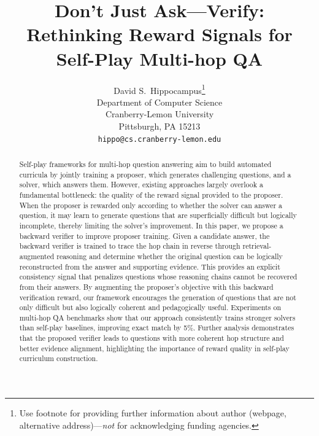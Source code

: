 \documentclass{article}
\title{Don’t Just Ask—Verify: Rethinking Reward Signals for Self-Play Multi-hop QA}
\author{%
  David S.~Hippocampus\thanks{Use footnote for providing further information
    about author (webpage, alternative address)---\emph{not} for acknowledging
    funding agencies.} \\
  Department of Computer Science\\
  Cranberry-Lemon University\\
  Pittsburgh, PA 15213 \\
  \texttt{hippo@cs.cranberry-lemon.edu} \\
}
\begin{document}
\maketitle


\begin{abstract}
  Self-play frameworks for multi-hop question answering aim to build automated curricula by jointly training a proposer, which generates challenging questions, and a solver, which answers them. However, existing approaches largely overlook a fundamental bottleneck: the quality of the reward signal provided to the proposer. When the proposer is rewarded only according to whether the solver can answer a question, it may learn to generate questions that are superficially difficult but logically incomplete, thereby limiting the solver’s improvement.
In this paper, we propose a backward verifier to improve proposer training. Given a candidate answer, the backward verifier is trained to trace the hop chain in reverse through retrieval-augmented reasoning and determine whether the original question can be logically reconstructed from the answer and supporting evidence. This provides an explicit consistency signal that penalizes questions whose reasoning chains cannot be recovered from their answers. By augmenting the proposer’s objective with this backward verification reward, our framework encourages the generation of questions that are not only difficult but also logically coherent and pedagogically useful. Experiments on multi-hop QA benchmarks show that our approach consistently trains stronger solvers than self-play baselines, improving exact match by 5\%. Further analysis demonstrates that the proposed verifier leads to questions with more coherent hop structure and better evidence alignment, highlighting the importance of reward quality in self-play curriculum construction.




\end{abstract}
\end{document}
